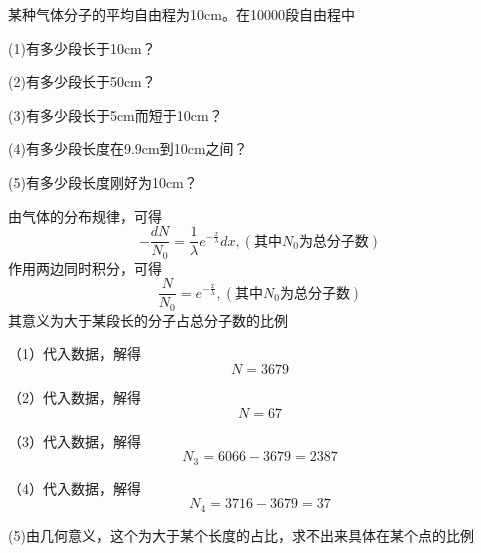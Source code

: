 \documentclass[lang=cn,10pt]{elegantbook}
\begin{document}
	\begin{example}
		某种气体分子的平均自由程为10cm。在10000段自由程中
		
		(1)有多少段长于10cm？
		
		(2)有多少段长于50cm？
		
		(3)有多少段长于5cm而短于10cm？
		
		(4)有多少段长度在9.9cm到10cm之间？
		
		(5)有多少段长度刚好为10cm？
	\end{example}
	\begin{solution}
		由气体的分布规律，可得
		\begin{equation*}
			-\frac{dN}{N_0}=\frac{1}{\lambda}e^{-\frac{x}{\lambda}}dx,(\text{其中}N_{0}\text{为总分子数})
		\end{equation*}
		作用两边同时积分，可得
		\begin{equation*}
			\frac{N}{N_0}=e^{-\frac{x}{\lambda}},(\text{其中}N_{0}\text{为总分子数})
		\end{equation*}
		其意义为大于某段长的分子占总分子数的比例
		
		（1）代入数据，解得
		\begin{equation*}
			N=3679
		\end{equation*}
		
		（2）代入数据，解得
		\begin{equation*}
			N=67
		\end{equation*}
		
		（3）代入数据，解得
		\begin{equation*}
			N_{3}=6066-3679=2387
		\end{equation*}
		
		（4）代入数据，解得
		\begin{equation*}
			N_{4}=3716-3679=37
		\end{equation*}
		
		(5)由几何意义，这个为大于某个长度的占比，求不出来具体在某个点的比例
	\end{solution}
\end{document}
